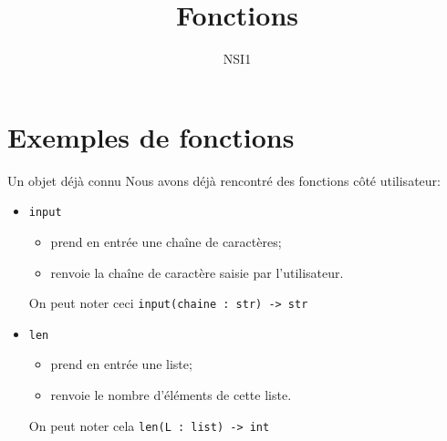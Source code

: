 \documentclass[10pt]{beamer}
\title{Fonctions}
\author{NSI1}
\begin{document}
	\maketitle
    \section{Exemples de fonctions}
    \begin{frame}{Un objet déjà connu}
        Nous avons déjà rencontré des fonctions \alert{côté utilisateur}:\pause
        \begin{itemize}
            \item \texttt{input} \pause
            \begin{itemize}
                \item prend en entrée une chaîne de caractères;\pause
                \item renvoie la chaîne de caractère saisie par l'utilisateur.\pause
            \end{itemize}
            On peut noter ceci \texttt{input(chaine : str) -> str}\pause
            \item \texttt{len}\pause
            \begin{itemize}
                \item	prend en entrée une liste;\pause
                \item	renvoie le nombre d'éléments de cette liste.\pause
            \end{itemize}
            On peut noter cela \texttt{len(L : list) -> int}
        \end{itemize}
    \end{frame}
\end{document}
